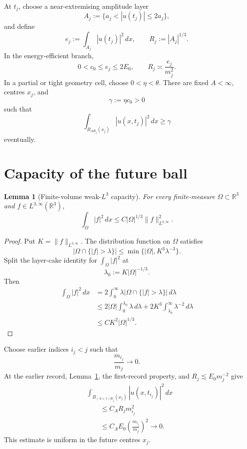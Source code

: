 \documentclass[11pt]{article}
\newtheorem{lemma}[theorem]{Lemma}
\theoremstyle{remark}
\newcommand{\R}{\mathbb R}
\begin{document}
At \(t_j\), choose a near-extremising amplitude layer
\[
 A_j:=\{a_j<|u(t_j)|\le2a_j\},
\]
and define
\[
 e_j:=\int_{A_j}|u(t_j)|^2\,dx,
 \qquad
 R_j:=|A_j|^{1/3}.
\]
In the energy-efficient branch,
\[
 0<c_0\le e_j\le2E_0,
 \qquad
 R_j\asymp\frac{e_j}{m_j^2}.
\]
In a partial or tight geometry cell, choose \(0<\eta<\theta\).
There are fixed \(A<\infty\), centres \(x_j\), and
\[
 \gamma:=\eta c_0>0
\]
such that
\begin{equation}
 \label{eq:final-floor}
 \boxed{
 \int_{B_{AR_j}(x_j)}|u(x,t_j)|^2\,dx\ge\gamma
 }
\end{equation}
eventually.

\section{Capacity of the future ball}

\begin{lemma}[Finite-volume weak-\(L^3\) capacity]
\label{lem:capacity}
For every finite-measure \(\Omega\subset\R^3\) and
\(f\in L^{3,\infty}(\R^3)\),
\[
 \boxed{
 \int_\Omega|f|^2\,dx
 \le
 C|\Omega|^{1/3}\|f\|_{L^{3,\infty}}^2.
 }
\]
\end{lemma}

\begin{proof}
Put \(K=\|f\|_{L^{3,\infty}}\).  The distribution function on \(\Omega\)
satisfies
\[
 |\Omega\cap\{|f|>\lambda\}|
 \le
 \min\{|\Omega|,K^3\lambda^{-3}\}.
\]
Split the layer-cake identity for \(\int_\Omega|f|^2\) at
\[
 \lambda_0:=K|\Omega|^{-1/3}.
\]
Then
\[
\begin{aligned}
 \int_\Omega|f|^2\,dx
 &=
 2\int_0^\infty
 \lambda|\Omega\cap\{|f|>\lambda\}|\,d\lambda\\
 &\le
 2|\Omega|\int_0^{\lambda_0}\lambda\,d\lambda
 +
 2K^3\int_{\lambda_0}^\infty\lambda^{-2}\,d\lambda\\
 &\le
 C K^2|\Omega|^{1/3}.
\end{aligned}
\]
\end{proof}

Choose earlier indices \(i_j<j\) such that
\begin{equation}
 \label{eq:amplitude-separation}
 \frac{m_{i_j}}{m_j}\longrightarrow0.
\end{equation}
At the earlier record, Lemma~\ref{lem:capacity}, the first-record property,
and \(R_j\lesssim E_0m_j^{-2}\) give
\begin{equation}
 \label{eq:initial-empty}
\begin{aligned}
 &\int_{B_{(A+1)R_j}(x_j)}
 |u(x,t_{i_j})|^2\,dx\\
 &\qquad\le
 C_AR_jm_{i_j}^2\\
 &\qquad\le
 C_AE_0\left(\frac{m_{i_j}}{m_j}\right)^2
 \longrightarrow0.
\end{aligned}
\end{equation}
This estimate is uniform in the future centres \(x_j\).
\end{document}
